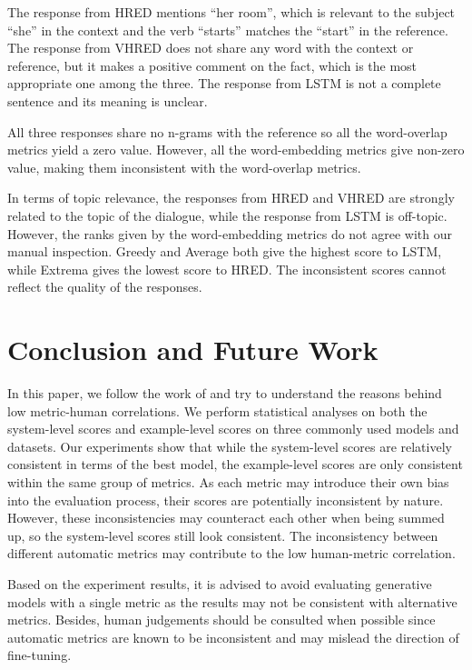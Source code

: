 \documentclass[conference]{IEEEtran}
\begin{document}
The response from HRED mentions ``her room'', which is relevant to the subject ``she'' in the context and the verb ``starts'' matches the ``start'' in the reference.
The response from VHRED does not share any word with the context or reference, but it makes a positive comment on the fact, which is the most appropriate one among the three.
The response from LSTM is not a complete sentence and its meaning is unclear.

All three responses share no n-grams with the reference so all the word-overlap metrics yield a zero value.
However, all the word-embedding metrics give non-zero value, making them inconsistent with the word-overlap metrics.

In terms of topic relevance, the responses from HRED and VHRED are strongly related to the topic of the dialogue, while the response from LSTM is off-topic.
However, the ranks given by the word-embedding metrics do not agree with our manual inspection.
Greedy and Average both give the highest score to LSTM, while Extrema gives the lowest score to HRED.
The inconsistent scores cannot reflect the quality of the responses.

\section{Conclusion and Future Work}
In this paper, we follow the work of \cite{HowNot} and try to understand the reasons behind low metric-human correlations.
We perform statistical analyses on both the system-level scores and example-level scores on three commonly used models and datasets.
Our experiments show that while the system-level scores are relatively consistent in terms of the best model,
the example-level scores are only consistent within the same group of metrics.
As each metric may introduce their own bias into the evaluation process, their scores are potentially inconsistent by nature.
However, these inconsistencies may counteract each other when being summed up, so the system-level scores still look consistent.
The inconsistency between different automatic metrics may contribute to the low human-metric correlation.

Based on the experiment results, it is advised to avoid evaluating generative models with a single metric as the results may not be
consistent with alternative metrics.
Besides, human judgements should be consulted when possible since
automatic metrics are known to be inconsistent and may mislead the direction of fine-tuning.
\end{document}
